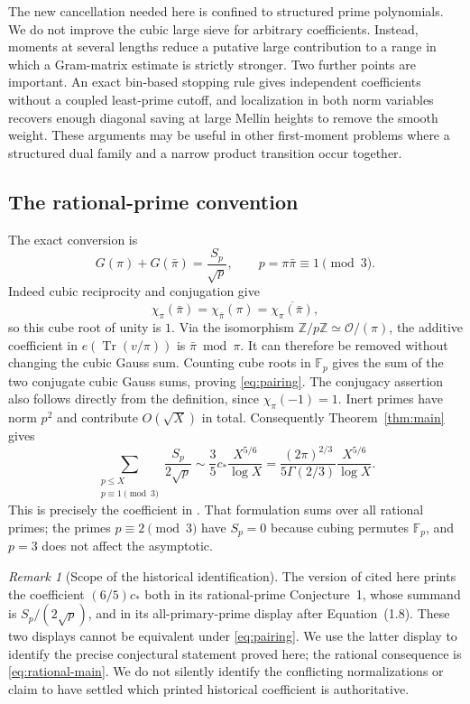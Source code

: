 \documentclass[11pt]{article}
\theoremstyle{definition}
\theoremstyle{remark}
\newtheorem{remark}[theorem]{Remark}
\numberwithin{equation}{section}
\DeclareMathOperator{\Tr}{Tr}
\begin{document}
The new cancellation needed here is confined to structured prime
polynomials. We do not improve the cubic large sieve for arbitrary
coefficients. Instead, moments at several lengths reduce a
putative large contribution to a range in which a Gram-matrix
estimate is strictly stronger. Two further points are important.
An exact bin-based stopping rule gives independent coefficients
without a coupled least-prime cutoff, and localization in both
norm variables recovers enough diagonal saving at large Mellin
heights to remove the smooth weight. These arguments may be useful
in other first-moment problems where a structured dual family and
a narrow product transition occur together.

\subsection{The rational-prime convention}\label{sec:normalization}
The exact conversion is
\begin{equation}\label{eq:pairing}
 G(\pi)+G(\bar\pi)=\frac{S_p}{\sqrt p},
 \qquad p=\pi\bar\pi\equiv1\pmod3.
\end{equation}
Indeed cubic reciprocity and conjugation give
\[
 \chi_\pi(\bar\pi)=\chi_{\bar\pi}(\pi)
     =\overline{\chi_\pi(\bar\pi)},
\]
so this cube root of unity is $1$. Via the isomorphism
$\mathbb Z/p\mathbb Z\simeq\mathcal O/(\pi)$, the additive
coefficient in $e(\Tr(v/\pi))$ is $\bar\pi\bmod\pi$.
It can therefore be removed without changing the cubic Gauss
sum. Counting cube roots in $\mathbb F_p$ gives the sum of the
two conjugate cubic Gauss sums, proving \eqref{eq:pairing}.
The conjugacy assertion also follows directly from the definition,
since $\chi_\pi(-1)=1$. Inert primes have norm $p^2$ and contribute
$O(\sqrt X)$ in total. Consequently Theorem~\ref{thm:main} gives
\begin{equation}\label{eq:rational-main}
 \sum_{\substack{p\le X\\p\equiv1\pmod3}}
       \frac{S_p}{2\sqrt p}
\sim \frac35c_*\frac{X^{5/6}}{\log X}
 =\frac{(2\pi)^{2/3}}{5\Gamma(2/3)}\frac{X^{5/6}}{\log X}.
\end{equation}
This is precisely the coefficient in \cite[Conjecture~4.13]{Wan2021}.
That formulation sums over all rational primes; the primes
$p\equiv2\pmod3$ have $S_p=0$ because cubing permutes $\mathbb F_p$,
and $p=3$ does not affect the asymptotic.

\begin{remark}[Scope of the historical identification]\label{rem:normalization}
The version of \cite{DR2024} cited here prints the coefficient
$(6/5)c_*$ both in its rational-prime Conjecture~1, whose summand is
$S_p/(2\sqrt p)$, and in its all-primary-prime display after
Equation~(1.8). These two displays cannot be equivalent under
\eqref{eq:pairing}. We use the latter display to identify the precise
conjectural statement proved here; the rational consequence is
\eqref{eq:rational-main}. We do not silently identify the conflicting
normalizations or claim to have settled which printed historical
coefficient is authoritative.
\end{remark}
\end{document}
